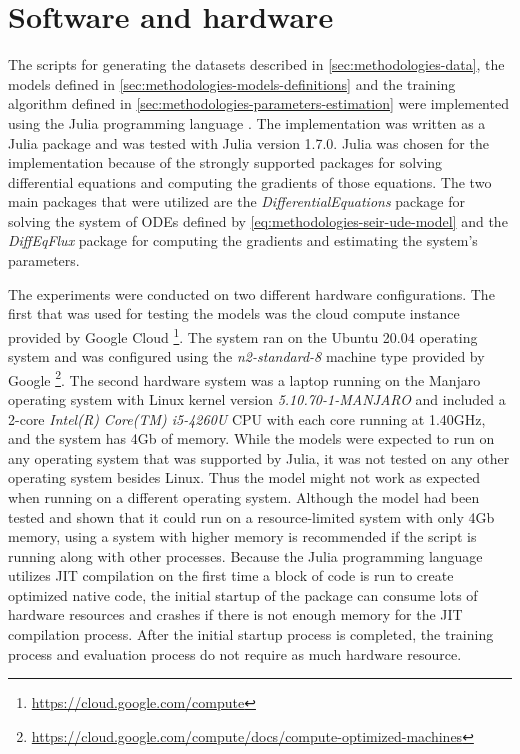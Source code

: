 \section{Software and hardware}

The scripts for generating the datasets described in \autoref{sec:methodologies-data}, the models defined in \autoref{sec:methodologies-models-definitions} and the training algorithm defined in \autoref{sec:methodologies-parameters-estimation} were implemented using the Julia programming language \cite{bezanson2012julia}.
The implementation was written as a Julia package and was tested with Julia version 1.7.0.
Julia was chosen for the implementation because of the strongly supported packages for solving differential equations and computing the gradients of those equations.
The two main packages that were utilized are the \textit{DifferentialEquations} package \cite{rackauckas2017differentialequations} for solving the system of \glspl{ODE} defined by \autoref{eq:methodologies-seir-ude-model} and the \textit{DiffEqFlux} \cite{rackauckasUniversalDifferentialEquations2020} package for computing the gradients and estimating the system's parameters.

The experiments were conducted on two different hardware configurations.
The first that was used for testing the models was the cloud compute instance provided by Google Cloud \footnote{\url{https://cloud.google.com/compute}}.
The system ran on the Ubuntu 20.04 operating system and was configured using the \textit{n2-standard-8} machine type provided by Google \footnote{\url{https://cloud.google.com/compute/docs/compute-optimized-machines}}.
The second hardware system was a laptop running on the Manjaro operating system with Linux kernel version \textit{5.10.70-1-MANJARO} and included a 2-core \textit{Intel(R) Core(TM) i5-4260U} CPU with each core running at 1.40GHz, and the system has 4Gb of memory.
While the models were expected to run on any operating system that was supported by Julia, it was not tested on any other operating system besides Linux.
Thus the model might not work as expected when running on a different operating system.
Although the model had been tested and shown that it could run on a resource-limited system with only 4Gb memory, using a system with higher memory is recommended if the script is running along with other processes.
Because the Julia programming language utilizes \gls{JIT} compilation on the first time a block of code is run to create optimized native code, the initial startup of the package can consume lots of hardware resources and crashes if there is not enough memory for the \gls{JIT} compilation process.
After the initial startup process is completed, the training process and evaluation process do not require as much hardware resource.

